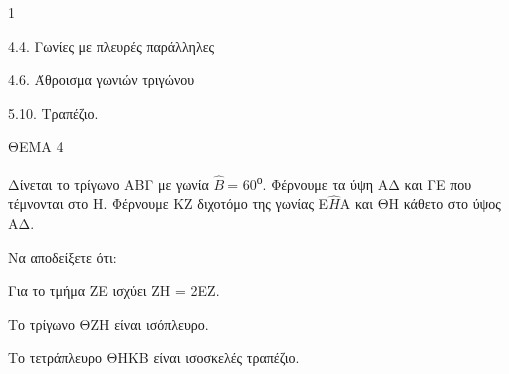\begin{ylh}{1}
    \item 4.4. Γωνίες με πλευρές παράλληλες
    \item 4.6. Άθροισμα γωνιών τριγώνου
    \item 5.10. Τραπέζιο.
\end{ylh}

ΘΕΜΑ 4

Δίνεται το τρίγωνο ΑΒΓ με γωνία $\widehat{Β}\ $= 60\textsuperscript{ο}. Φέρνουμε τα ύψη ΑΔ και ΓΕ που τέμνονται στο Η. Φέρνουμε ΚΖ διχοτόμο της γωνίας Ε$\widehat{Η}$Α και ΘΗ κάθετο στο ύψος ΑΔ.

Να αποδείξετε ότι:

\begin{alist}
\item Για το τμήμα ΖΕ ισχύει ΖΗ = 2ΕΖ. 

\item Το τρίγωνο ΘΖΗ είναι ισόπλευρο. 

\item Το τετράπλευρο ΘΗΚΒ είναι ισοσκελές τραπέζιο. 


\end{alist}
